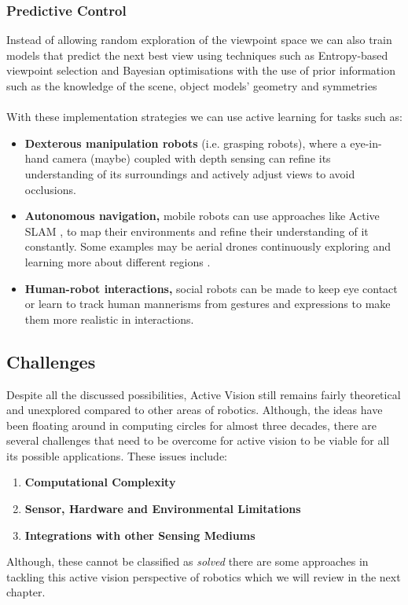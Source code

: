  \subsubsection{Predictive Control}
  Instead of allowing random exploration of the viewpoint space we can also train models that predict the next best view using techniques such as Entropy-based viewpoint selection and Bayesian optimisations with the use of prior information such as the knowledge of the scene, object models' geometry and symmetries \cite{dhami2023prednbvpredictionguidednextbestview3d,breyer2022closedloopnextbestviewplanningtargetdriven}
  \\\\
  With these implementation strategies we can use active learning for tasks such as:
  \begin{itemize}
    \item \textbf{Dexterous manipulation robots} (i.e. grasping robots), where a eye-in-hand camera (maybe) coupled with depth sensing can refine its understanding of its surroundings and actively adjust views to avoid occlusions. 
    \item \textbf{Autonomous navigation,} mobile robots can use approaches like Active SLAM \cite{s23198097}, to map their environments and refine their understanding of it constantly. Some examples may be aerial drones continuously exploring and learning more about different regions \cite{drones6040085}.
    \item \textbf{Human-robot interactions,} social robots can be made to keep eye contact or learn to track human mannerisms from gestures and expressions to make them more realistic in interactions.
  \end{itemize}
    
  \subsection{Challenges}
  Despite all the discussed possibilities, Active Vision still remains fairly theoretical and unexplored compared to other areas of robotics. Although, the ideas have been floating around in computing circles for almost three decades, there are several challenges that need to be overcome for active vision to be viable for all its possible applications. These issues include:
  \begin{enumerate}
    \item \textbf{Computational Complexity}
    \item \textbf{Sensor, Hardware and Environmental Limitations}
    \item \textbf{Integrations with other Sensing Mediums
    }
  \end{enumerate}

  Although, these cannot be classified as \emph{solved} there are some approaches in tackling this active vision perspective of robotics which we will review in the next chapter.